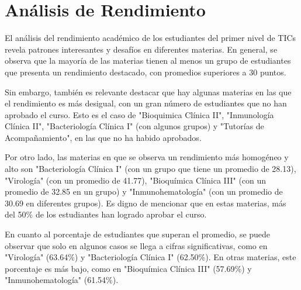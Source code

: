 \vspace{1cm}
\section{Análisis de Rendimiento}
El análisis del rendimiento académico de los estudiantes del primer nivel de TICs revela patrones interesantes y desafíos en diferentes materias. En general, se observa que la mayoría de las materias tienen al menos un grupo de estudiantes que presenta un rendimiento destacado, con promedios superiores a 30 puntos.

Sin embargo, también es relevante destacar que hay algunas materias en las que el rendimiento es más desigual, con un gran número de estudiantes que no han aprobado el curso. Esto es el caso de "Bioquimica Clínica II", "Inmunología Clínica II", "Bacteriología Clínica I" (con algunos grupos) y "Tutorías de Acompañamiento", en las que no ha habido aprobados.

Por otro lado, las materias en que se observa un rendimiento más homogéneo y alto son "Bacteriología Clínica I" (con un grupo que tiene un promedio de 28.13), "Virología" (con un promedio de 41.77), "Bioquímica Clínica III" (con un promedio de 32.85 en un grupo) y "Inmunohematología" (con un promedio de 30.69 en diferentes grupos). Es digno de mencionar que en estas materias, más del 50\% de los estudiantes han logrado aprobar el curso.

En cuanto al porcentaje de estudiantes que superan el promedio, se puede observar que solo en algunos casos se llega a cifras significativas, como en "Virología" (63.64\%) y "Bacteriología Clínica I" (62.50\%). En otras materias, este porcentaje es más bajo, como en "Bioquímica Clínica III" (57.69\%) y "Inmunohematología" (61.54\%).

